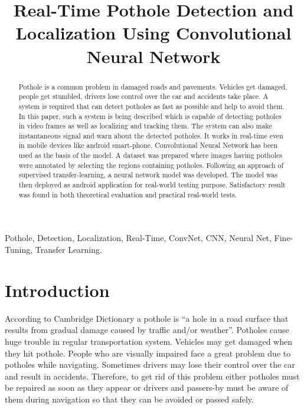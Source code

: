 \documentclass[conference]{IEEEtran}
\title{Real-Time Pothole Detection and Localization Using Convolutional Neural Network}
\begin{document}
\maketitle
 
\thispagestyle{plain}
\pagestyle{plain}
\begin{abstract}
  Pothole is a common problem in damaged roads and pavements. Vehicles get damaged, people get stumbled, drivers lose control over the car and accidents take place. A system is required that can detect potholes as fast as possible and help to avoid them. In this paper, such a system is being described which is capable of detecting potholes in video frames as well as localizing and tracking them. The system can also make instantaneous signal and warn about the detected potholes. It works in real-time even in mobile devices like android smart-phone. Convolutional Neural Network has been used as the basis of the model. A dataset was prepared where images having potholes were annotated by selecting the regions containing potholes. Following an approach of supervised transfer-learning, a neural network model was developed. The model was then deployed as android application for real-world testing purpose. Satisfactory result was found in both theoretical evaluation and practical real-world tests.
\end{abstract}
 
\begin{IEEEkeywords}
  Pothole, Detection, Localization, Real-Time, ConvNet, CNN, Neural Net, Fine-Tuning, Transfer Learning.
\end{IEEEkeywords}

\section{Introduction}
According to Cambridge Dictionary\cite{walter2008cambridge} a pothole is ``a hole in a road surface that results from gradual damage caused by traffic and/or weather''. Potholes cause huge trouble in regular transportation system. Vehicles may get damaged when they hit pothole. People who are visually impaired face a great problem due to potholes while navigating. Sometimes drivers may lose their control over the car and result in accidents. Therefore, to get rid of this problem either potholes must be repaired as soon as they appear or drivers and passers-by must be aware of them during navigation so that they can be avoided or passed safely.
  
\end{document}
